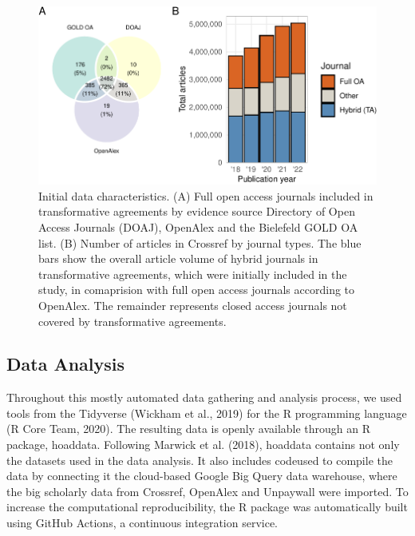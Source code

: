 \documentclass[a4paper,man,floatsintext,longtable,noextraspace,12pt]{apa6}
\begin{document}
\begin{figure}

{\centering \includegraphics[width=0.99\linewidth]{fig/method_fig-1} 

}

\caption{Initial data characteristics. (A) Full open access journals included in transformative agreements by evidence source Directory of Open Access Journals (DOAJ), OpenAlex and the Bielefeld GOLD OA list. (B) Number of articles in Crossref by journal types. The blue bars show the overall article volume of hybrid journals in transformative agreements, which were initially included in the study, in comaprision with full open access journals according to OpenAlex. The remainder represents closed access journals not covered by transformative agreements.}\label{fig:method_fig}
\end{figure}

\hypertarget{data-analysis}{%
\subsection{Data Analysis}\label{data-analysis}}

Throughout this mostly automated data gathering and analysis process, we
used tools from the Tidyverse (Wickham et al., 2019) for the R
programming language (R Core Team, 2020). The resulting data is openly
available through an R package, hoaddata. Following Marwick et al.
(2018), hoaddata contains not only the datasets used in the data
analysis. It also includes codeused to compile the data by connecting it
the cloud-based Google Big Query data warehouse, where the big scholarly
data from Crossref, OpenAlex and Unpaywall were imported. To increase
the computational reproducibility, the R package was automatically built
using GitHub Actions, a continuous integration service.
\end{document}
